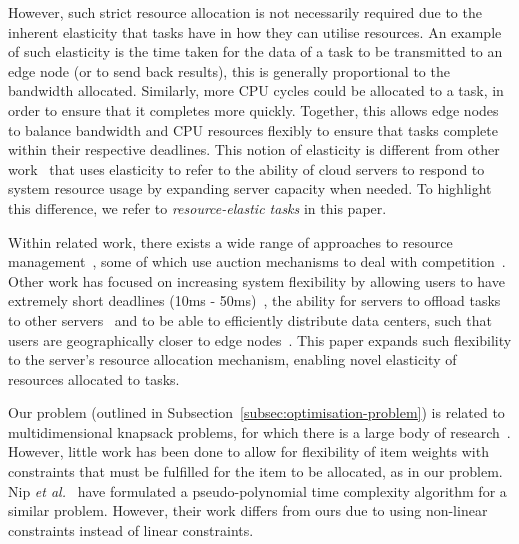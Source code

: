 However, such strict resource allocation is not necessarily required due to the inherent elasticity that tasks have in how they can utilise resources. An example of such elasticity is the time taken for the data of a task to be transmitted to an edge node (or to send back results), this is generally proportional to the bandwidth allocated. Similarly, more CPU cycles could be allocated to a task, in order to ensure that it completes more quickly. Together, this allows edge nodes to balance bandwidth and CPU resources flexibly to ensure that tasks complete within their respective deadlines. This notion of elasticity is different from other work~\cite{ServerElasticity} that uses elasticity to refer to the ability of cloud servers to respond to system resource usage by expanding server capacity when needed. To highlight this difference, we refer to \emph{resource-elastic tasks} in this paper.

Within related work, there exists a wide range of approaches to resource management~\cite{ghobaei2019resource}, some of which use auction mechanisms to deal with competition~\cite{KUMAR2017234,Zhang2017,Du2019,Bi2019}. Other work has focused on increasing system flexibility by allowing users to have extremely short deadlines (10\:ms - 50\:ms)~\cite{tasiopoulos2018edge}, the ability for servers to offload tasks to other servers~\cite{8373684} and to be able to efficiently distribute data centers, such that users are geographically closer to edge nodes~\cite{8839780}. This paper expands such flexibility to the server's resource allocation mechanism, enabling novel elasticity of resources allocated to tasks.

Our problem (outlined in Subsection~\ref{subsec:optimisation-problem}) is related to multidimensional knapsack problems, for which there is a large body of research~\cite{knapsacks, numbers}. However, little work has been done to allow for flexibility of item weights with constraints that must be fulfilled for the item to be allocated, as in our problem. Nip \textit{et al.}~\cite{Nip2017} have formulated a pseudo-polynomial time complexity algorithm for a similar problem. However, their work differs from ours due to using non-linear constraints instead of linear constraints.

